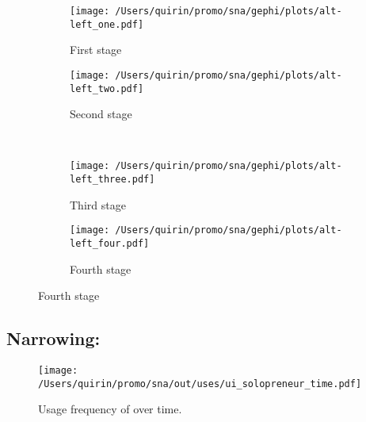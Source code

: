 \documentclass[
  a4paper,
  ]{scrartcl}
\begin{document}
    \begin{figure}[H]
      \caption{Social network of diffusion for  over time.}
      \centering
      \begin{subfigure}{.45\linewidth}
        \caption{First stage}
        \centering
        \texttt{[image: /Users/quirin/promo/sna/gephi/plots/alt-left\_one.pdf]}
      \end{subfigure}
      \begin{subfigure}{.45\linewidth}
        \caption{Second stage}
        \centering
        \texttt{[image: /Users/quirin/promo/sna/gephi/plots/alt-left\_two.pdf]}
      \end{subfigure}\\
      \begin{subfigure}{.45\linewidth}
        \caption{Third stage}
        \centering
        \texttt{[image: /Users/quirin/promo/sna/gephi/plots/alt-left\_three.pdf]}
      \end{subfigure}
      \begin{subfigure}{.45\linewidth}
        \caption{Fourth stage}
        \centering
        \texttt{[image: /Users/quirin/promo/sna/gephi/plots/alt-left\_four.pdf]}
      \end{subfigure}
    \end{figure}

  \subsection{Narrowing: }

    \begin{figure}[H]
      \caption{Usage frequency of  over time.}
      \centering
      \texttt{[image: /Users/quirin/promo/sna/out/uses/ui\_solopreneur\_time.pdf]}
    \end{figure}
\end{document}
